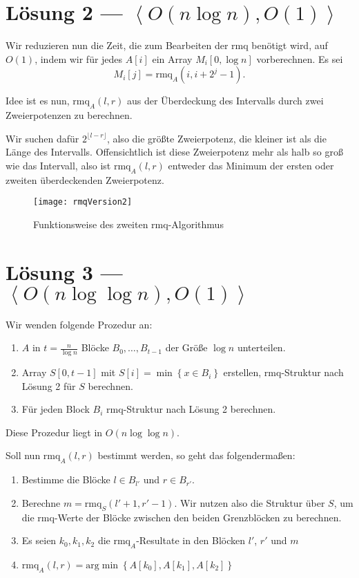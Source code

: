 \section{Lösung 2 --- \( \left\langle O(n\log n),O(1) \right\rangle \)}

Wir reduzieren nun die Zeit, die zum Bearbeiten der rmq benötigt wird, auf \( O(1) \), indem wir für jedes \( A[i] \) ein Array \( M_i[0,\log n] \) vorberechnen. Es sei
\begin{equation*}
  M_i[j] = \text{rmq}_A(i,i+2^j-1)\text{.}
\end{equation*}

Idee ist es nun, \( \text{rmq}_A(l,r) \) aus der Überdeckung des Intervalls durch zwei Zweierpotenzen zu berechnen.

Wir suchen dafür \( 2^{\lfloor l - r \rfloor} \), also die größte Zweierpotenz, die kleiner ist als die Länge des Intervalls. Offensichtlich ist diese Zweierpotenz mehr als halb so groß wie das Intervall, also ist \( \text{rmq}_A(l,r) \) entweder das Minimum der ersten oder zweiten überdeckenden Zweierpotenz.

\begin{figure}[H]
  \texttt{[image: rmqVersion2]}
  \caption{Funktionsweise des zweiten rmq-Algorithmus}
\end{figure}

\section{Lösung 3 --- \( \left\langle O(n \log \log n), O(1) \right\rangle \)}

Wir wenden folgende Prozedur an:

\begin{enumerate}
  \item \( A \) in \( t = \frac{n}{\log n} \) Blöcke \( B_0, \dots, B_{t-1} \) der Größe \( \log n \) unterteilen.
  \item Array \( S[0,t-1] \) mit \( S[i] = \min\left \{ x \in B_i \right \} \) erstellen, rmq-Struktur nach Lösung 2 für \( S \) berechnen.
  \item Für jeden Block \( B_i \) rmq-Struktur nach Lösung 2 berechnen.
\end{enumerate}

Diese Prozedur liegt in \( O(n \log \log n) \).

Soll nun \( \text{rmq}_A(l,r) \) bestimmt werden, so geht das folgendermaßen:

\begin{enumerate}
  \item Bestimme die Blöcke \( l \in B_{l'} \) und \( r \in B_{r'} \).
  \item Berechne \( m = \text{rmq}_S(l'+1, r'-1) \). Wir nutzen also die Struktur über \( S \), um die rmq-Werte der Blöcke zwischen den beiden Grenzblöcken zu berechnen.
  \item Es seien \( k_0,k_1,k_2 \) die \( \text{rmq}_A \)-Resultate in den Blöcken \( l' \), \( r' \) und \( m \)
  \item \( \text{rmq}_A(l,r) = \text{arg}\min \left \{ A[k_0],A[k_1],A[k_2] \right \} \)
\end{enumerate}

